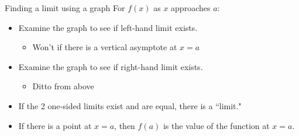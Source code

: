 \documentclass[t]{beamer}
\begin{document}
\begin{frame}{Finding a limit using a graph}
    For $f(x)$ as $x$ approaches $a$:   \newline\\  \pause
    \begin{itemize}
        \item Examine the graph to see if left-hand limit exists.\newline\\  \pause
        \begin{itemize}
            \item Won't if there is a vertical asymptote at $x=a$\newline\\  \pause
        \end{itemize}
        \item Examine the graph to see if right-hand limit exists.\newline\\  \pause
        \begin{itemize}
            \item Ditto from above\newline\\  \pause
        \end{itemize}
        \item If the 2 one-sided limits exist and are equal, there is a ``limit."\newline\\  \pause
        \item If there is a point at $x = a$, then $f(a)$ is the value of the function at $x=a$.
    \end{itemize}
\end{frame}
\end{document}
